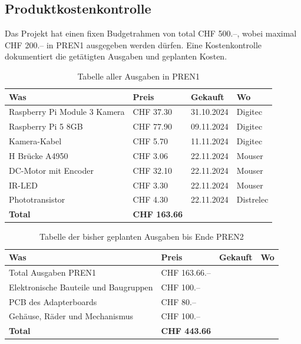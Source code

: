 \documentclass[../main.tex]{subfiles}
\begin{document}
\subsection{Produktkostenkontrolle}
Das Projekt hat einen fixen Budgetrahmen von total CHF 500.--, wobei maximal CHF 200.-- in PREN1 ausgegeben werden dürfen. Eine Kostenkontrolle dokumentiert die getätigten Ausgaben und geplanten Kosten.
\begin{table}[H]
\begin{tabular}{|p{6cm}|p{2.5cm}|p{2cm}|p{2.5cm}|}
\hline
\textbf{Was} & \textbf{Preis} & \textbf{Gekauft} & \textbf{Wo} \\ \hline
Raspberry Pi Module 3 Kamera & CHF 37.30 & 31.10.2024 & Digitec \\ \hline
Raspberry Pi 5 8GB & CHF 77.90 & 09.11.2024 & Digitec \\ \hline
Kamera-Kabel & CHF 5.70 & 11.11.2024 & Digitec \\ \hline
H Brücke A4950 & CHF 3.06 & 22.11.2024 & Mouser \\ \hline
DC-Motor mit Encoder & CHF 32.10 & 22.11.2024 & Mouser \\ \hline
IR-LED & CHF 3.30 & 22.11.2024 & Mouser \\ \hline
Phototransistor & CHF 4.30 & 22.11.2024 & Distrelec \\ \hline
\hline
\textbf{Total} & \textbf{CHF 163.66} & & \\ \hline
\end{tabular}
\caption{Tabelle aller Ausgaben in PREN1}
\label{tab:ausgaben_pren1}
\end{table}

\begin{table}[H]
\begin{tabular}{|p{6cm}|p{2.5cm}|p{2cm}|p{2.5cm}|}
\hline
\textbf{Was} & \textbf{Preis} & \textbf{Gekauft} & \textbf{Wo} \\ \hline
Total Ausgaben PREN1 & CHF 163.66.-- &  &  \\ \hline
Elektronische Bauteile und Baugruppen & CHF 100.-- &  &  \\ \hline
PCB des Adapterboards & CHF 80.-- &  &  \\ \hline
Gehäuse, Räder und Mechanismus & CHF 100.-- &  &  \\ \hline
\hline
\textbf{Total} & \textbf{CHF 443.66} & & \\ \hline
\end{tabular}
\caption{Tabelle der bisher geplanten Ausgaben bis Ende PREN2}
\label{tab:ausgaben_pren2}
\end{table}
\end{document}
